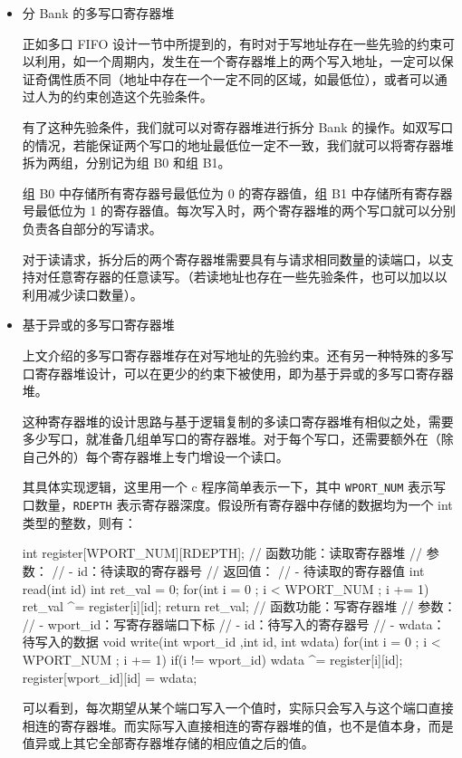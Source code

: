 \begin{itemize}
\item
  分 Bank 的多写口寄存器堆

  正如多口 FIFO 设计一节中所提到的，有时对于写地址存在一些先验的约束可以利用，如一个周期内，发生在一个寄存器堆上的两个写入地址，一定可以保证奇偶性质不同（地址中存在一个一定不同的区域，如最低位），或者可以通过人为的约束创造这个先验条件。

  有了这种先验条件，我们就可以对寄存器堆进行拆分 Bank 的操作。如双写口的情况，若能保证两个写口的地址最低位一定不一致，我们就可以将寄存器堆拆为两组，分别记为组 B0 和组 B1。

  组 B0 中存储所有寄存器号最低位为 0 的寄存器值，组 B1 中存储所有寄存器号最低位为 1 的寄存器值。每次写入时，两个寄存器堆的两个写口就可以分别负责各自部分的写请求。

  对于读请求，拆分后的两个寄存器堆需要具有与请求相同数量的读端口，以支持对任意寄存器的任意读写。（若读地址也存在一些先验条件，也可以加以以利用减少读口数量）。
\item
  基于异或的多写口寄存器堆

  上文介绍的多写口寄存器堆存在对写地址的先验约束。还有另一种特殊的多写口寄存器堆设计，可以在更少的约束下被使用，即为基于异或的多写口寄存器堆。

  这种寄存器堆的设计思路与基于逻辑复制的多读口寄存器堆有相似之处，需要多少写口，就准备几组单写口的寄存器堆。对于每个写口，还需要额外在（除自己外的）每个寄存器堆上专门增设一个读口。

  其具体实现逻辑，这里用一个 c 程序简单表示一下，其中 \texttt{WPORT\_NUM} 表示写口数量，\texttt{RDEPTH} 表示寄存器深度。假设所有寄存器中存储的数据均为一个 int 类型的整数，则有：

\begin{CodeBlock}[language=BookC]
int register[WPORT_NUM][RDEPTH];
// 函数功能：读取寄存器堆
// 参数：
//  - id：待读取的寄存器号
// 返回值：
//  - 待读取的寄存器值
int read(int id) {
int ret_val = 0;
for(int i = 0 ; i < WPORT_NUM ; i += 1) {
  ret_val ^= register[i][id];
}
return ret_val;
}
// 函数功能：写寄存器堆
// 参数：
//  - wport_id：写寄存器端口下标
//  - id：待写入的寄存器号
//  - wdata：待写入的数据
void write(int wport_id ,int id, int wdata) {
  for(int i = 0 ; i < WPORT_NUM ; i += 1) {
      if(i != wport_id) wdata ^= register[i][id];
  }
  register[wport_id][id] = wdata;
}
\end{CodeBlock}

  可以看到，每次期望从某个端口写入一个值时，实际只会写入与这个端口直接相连的寄存器堆。而实际写入直接相连的寄存器堆的值，也不是值本身，而是值异或上其它全部寄存器堆存储的相应值之后的值。


\end{itemize}
